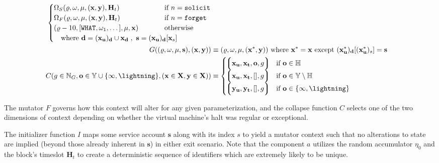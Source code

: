 \begin{align}
\begin{cases}
    \Omega_S(\gascounter, \registers, \memory, (\mathbf{x}, \mathbf{y}), \mathbf{H}_t) &\when n = \mathtt{solicit} \\
    \Omega_F(\gascounter, \registers, \memory, (\mathbf{x}, \mathbf{y}), \mathbf{H}_t) &\when n = \mathtt{forget} \\
    (\gascounter - 10, [\mathtt{WHAT}, \registers_1, \dots], \memory, \mathbf{x}) &\otherwise\\
    \quad \where \mathbf{d} = (\mathbf{x}_\mathbf{u})_\mathbf{d}\cup\mathbf{x}_\mathbf{d}\;,\ \mathbf{s} = (\mathbf{x}_\mathbf{u})_\mathbf{d}[\mathbf{x}_s]\!\!\!\!\!\!\!\!\!\!\!\!\!\!\!\!\!& \\
  \end{cases} \\
  G((\gascounter, \registers, \memory, \mathbf{s}), (\mathbf{x}, \mathbf{y})) &\equiv (\gascounter, \registers, \memory, (\mathbf{x}^*, \mathbf{y}))\ \where \mathbf{x}^* = \mathbf{x} \exc (\mathbf{x}^*_\mathbf{u})_\mathbf{d}[(\mathbf{x}^*_\mathbf{u})_s] = \mathbf{s} \\
  C(g \in \N_G, \mathbf{o} \in \mathbb{Y} \cup \{\oog, \panic\}, (\mathbf{x}\in\mathbf{X}, \mathbf{y}\in\mathbf{X})) &\equiv \begin{cases}
    \tup{
      \mathbf{x}_\mathbf{u},
      \mathbf{x}_\mathbf{t},
      \mathbf{o},
      g
    } & \when \mathbf{o} \in \mathbb{H} \\
    \tup{
      \mathbf{x}_\mathbf{u},
      \mathbf{x}_\mathbf{t},
      [],
      g
    } & \when \mathbf{o} \in \mathbb{Y} \setminus \H \\
    \tup{
      \mathbf{y}_\mathbf{u},
      \mathbf{y}_\mathbf{t},
      [],
      g
    } & \when \mathbf{o} \in \{\oog, \panic\} \\
  \end{cases}
\end{align}

The mutator $F$ governs how this context will alter for any given parameterization, and the collapse function $C$ selects one of the two dimensions of context depending on whether the virtual machine's halt was regular or exceptional.

The initializer function $I$ maps some service account $\mathbf{s}$ along with its index $s$ to yield a mutator context such that no alterations to state are implied (beyond those already inherent in $\mathbf{s}$) in either exit scenario. Note that the component $a$ utilizes the random accumulator $\eta_0$ and the block's timeslot $\mathbf{H}_t$ to create a deterministic sequence of identifiers which are extremely likely to be unique.

